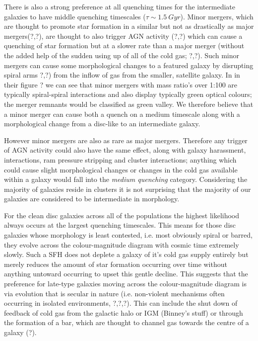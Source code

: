 \documentclass{mn2e}
\begin{document}
There is also a strong preference at all quenching times for the intermediate galaxies to have middle quenching timescales ($\tau \sim 1.5~Gyr$). Minor mergers, which are thought to promote star formation in a similar but not as drastically as major mergers(?,?), are thought to also trigger AGN activity (?,?) which can cause a quenching of star formation but at a slower rate than a major merger (without the added help of the sudden using up of all of the cold gas; ?,?). Such minor mergers can cause some morphological changes to a featured galaxy by disrupting spiral arms ?,?) from the inflow of gas from the smaller, satellite galaxy. In \citet{Darg} in their figure ? we can see that minor mergers with mass ratio's over 1:100 are typically spiral-spiral interactions and also display typically green optical colours; the merger remnants would be classified as green valley. We therefore believe that a minor merger can cause both a quench on a medium timescale along with a morphological change from a disc-like to an intermediate galaxy.

However minor mergers are also as rare as major mergers. Therefore any trigger of AGN activity could also have the same effect, along with galaxy harassment, interactions, ram pressure stripping and cluster interactions; anything which could cause slight morphological changes or changes in the cold gas available within a galaxy would fall into the \emph{medium quenching} category. Considering the majority of galaxies reside in clusters it is not surprising that the majority of our galaxies are considered to be intermediate in morphology. 

For the clean disc galaxies across all of the populations the highest likelihood always occurs at the largest quenching timescales. This means for those disc galaxies whose morphology is least contested, i.e. most obviously spiral or barred, they evolve across the colour-magnitude diagram with cosmic time extremely slowly. Such a SFH does not deplete a galaxy of it's cold gas supply entirely but merely reduces the amount of star formation occurring over time without anything untoward occurring to upset this gentle decline. This suggests that the preference for late-type galaxies moving across the colour-magnitude diagram is via evolution that is secular in nature (i.e. non-violent mechanisms often occurring in isolated environments, ?,?,?). This can include the shut down of feedback of cold gas from the galactic halo or IGM (Binney's stuff) or through the formation of a bar, which are thought to channel gas towards the centre of a galaxy (?). 
\end{document}
